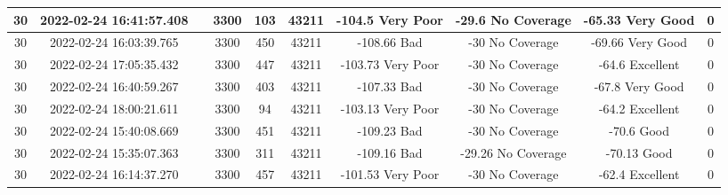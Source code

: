 \begin{longtable*}{|c|c|c|c|c|c|c|c|c|c|}
30&2022-02-24 16:41:57.408&&3300&103&43211& -104.5    Very Poor   & -29.6     No Coverage & -65.33    Very Good   & 0\\\hline
{}30&2022-02-24 16:03:39.765&&3300&450&43211& -108.66   Bad         & -30       No Coverage & -69.66    Very Good   & 0\\\hline
{}30&2022-02-24 17:05:35.432&&3300&447&43211& -103.73   Very Poor   & -30       No Coverage & -64.6     Excellent   & 0\\\hline
{}30&2022-02-24 16:40:59.267&&3300&403&43211& -107.33   Bad         & -30       No Coverage & -67.8     Very Good   & 0\\\hline
{}30&2022-02-24 18:00:21.611&&3300&94&43211& -103.13   Very Poor   & -30       No Coverage & -64.2     Excellent   & 0\\\hline
{}30&2022-02-24 15:40:08.669&&3300&451&43211& -109.23   Bad         & -30       No Coverage & -70.6     Good        & 0\\\hline
{}30&2022-02-24 15:35:07.363&&3300&311&43211& -109.16   Bad         & -29.26    No Coverage & -70.13    Good        & 0\\\hline
{}30&2022-02-24 16:14:37.270&&3300&457&43211& -101.53   Very Poor   & -30       No Coverage & -62.4     Excellent   & 0\\\hline

\end{longtable*}
